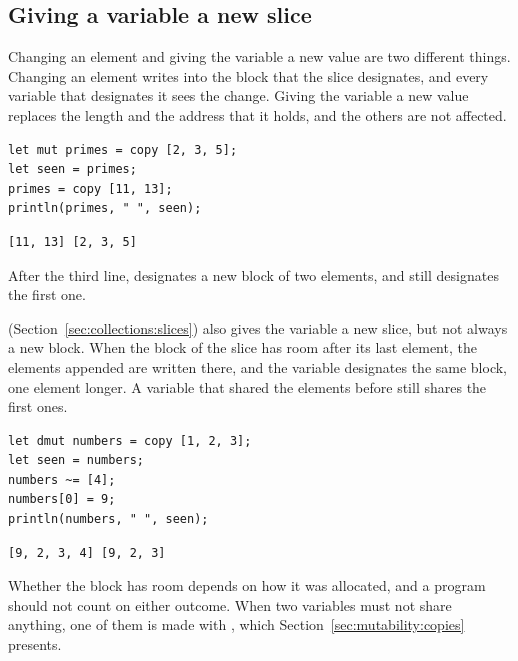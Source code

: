 \subsection{Giving a variable a new slice}

Changing an element and giving the variable a new value are two different
things. Changing an element writes into the block that the slice designates, and
every variable that designates it sees the change. Giving the variable a new
value replaces the length and the address that it holds, and the others are not
affected.

\begin{lstlisting}[style=coloredverbatim]
let mut primes = copy [2, 3, 5];
let seen = primes;
primes = copy [11, 13];
println(primes, " ", seen);
\end{lstlisting}
\vspace{-10pt}%
\begin{lstlisting}[style=bashVerb]
[11, 13] [2, 3, 5]
\end{lstlisting}

After the third line,  designates a new block of two elements,
and  still designates the first one.

\tokennolst{\mtildeascii{}=} (Section~\ref{sec:collections:slices}) also gives
the variable a new slice, but not always a new block. When the block of the
slice has room after its last element, the elements appended are written there,
and the variable designates the same block, one element longer. A variable that
shared the elements before still shares the first ones.

\begin{lstlisting}[style=coloredverbatim]
let dmut numbers = copy [1, 2, 3];
let seen = numbers;
numbers ~= [4];
numbers[0] = 9;
println(numbers, " ", seen);
\end{lstlisting}
\vspace{-10pt}%
\begin{lstlisting}[style=bashVerb]
[9, 2, 3, 4] [9, 2, 3]
\end{lstlisting}

Whether the block has room depends on how it was allocated, and a program
should not count on either outcome. When two variables must not share anything,
one of them is made with , which Section~\ref{sec:mutability:copies}
presents.
